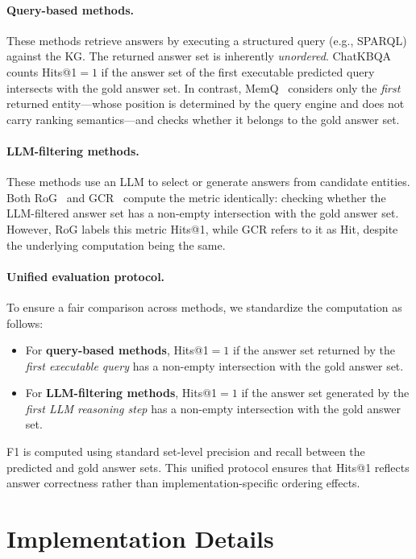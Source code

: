 \documentclass[11pt]{article}
\begin{document}
\paragraph{Query-based methods.}
These methods retrieve answers by executing a structured query (e.g., SPARQL) against the KG. The returned answer set is inherently \emph{unordered}. ChatKBQA~\citep{luo-etal-2024-chatkbqa} counts Hits@1${=}1$ if the answer set of the first executable predicted query intersects with the gold answer set. In contrast, MemQ~\citep{xu-etal-2025-memory} considers only the \emph{first} returned entity---whose position is determined by the query engine and does not carry ranking semantics---and checks whether it belongs to the gold answer set.

\paragraph{LLM-filtering methods.}
These methods use an LLM to select or generate answers from candidate entities. Both RoG~\citep{luo2024rog} and GCR~\citep{pmlr-v267-luo25t} compute the metric identically: checking whether the LLM-filtered answer set has a non-empty intersection with the gold answer set. However, RoG labels this metric Hits@1, while GCR refers to it as Hit, despite the underlying computation being the same.

\paragraph{Unified evaluation protocol.}
To ensure a fair comparison across methods, we standardize the computation as follows:
\begin{itemize}
    \item For \textbf{query-based methods}, Hits@1${=}1$ if the answer set returned by the \emph{first executable query} has a non-empty intersection with the gold answer set.
    \item For \textbf{LLM-filtering methods}, Hits@1${=}1$ if the answer set generated by the \emph{first LLM reasoning step} has a non-empty intersection with the gold answer set.
\end{itemize}
F1 is computed using standard set-level precision and recall between the predicted and gold answer sets. This unified protocol ensures that Hits@1 reflects answer correctness rather than implementation-specific ordering effects.

\section{Implementation Details}
\label{app:implementation}
\end{document}

